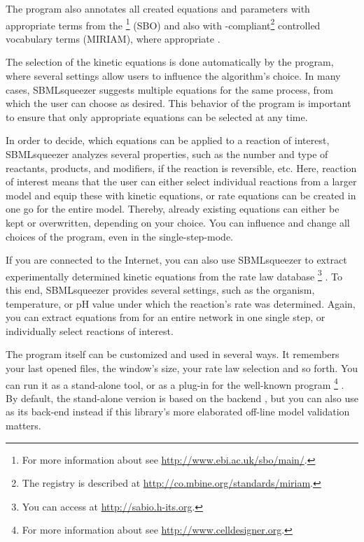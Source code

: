 The program also annotates all created equations and parameters with appropriate
terms from the \SBO\footnote{For more information about \SBO see \url{http://www.ebi.ac.uk/sbo/main/}.}
(\acl{SBO}) and also
with \MIRIAM-compliant\footnote{The \MIRIAM registry is described at \url{http://co.mbine.org/standards/miriam}.}
controlled vocabulary terms (\acl{MIRIAM}), where appropriate \citep{Le2005, Novere2006b, Laible2007, Courtot2011}.

The selection of the kinetic equations is done automatically by the program,
where several settings allow users to influence the algorithm's choice.
In many cases, SBMLsqueezer suggests multiple equations for the same process,
from which the user can choose as desired.
This behavior of the program is important to ensure that only appropriate
equations can be selected at any time.

In order to decide, which equations can be applied to a reaction of interest,
SBMLsqueezer analyzes several properties, such as the number and type of
reactants, products, and modifiers, if the reaction is reversible, etc.
Here, reaction of interest means that the user can either select individual
reactions from a larger model and equip these with kinetic equations, or rate
equations can be created in one go for the entire model.
Thereby, already existing equations can either be kept or overwritten, depending
on your choice.
You can influence and change all choices of the program, even in the single-step-mode.

If you are connected to the Internet, you can also use SBMLsqueezer to extract
experimentally determined kinetic equations from the rate law database
\SABIO\footnote{You can access \SABIO at \url{http://sabio.h-its.org}.}
\citep{Wittig2006, Rojas2007, Krebs2007, Wittig2012}.
To this end, SBMLsqueezer provides several settings, such as the organism,
temperature, or pH value under which the reaction's rate was determined. Again,
you can extract equations from \SABIO for an entire network in one single step, or
individually select reactions of interest.

The program itself can be customized and used in several ways. It remembers your
last opened files, the window's size, your rate law selection and so forth.
You can run it as a stand-alone tool, or as a plug-in for the well-known program
\CellDesigner\footnote{For more information about \CellDesigner see \url{http://www.celldesigner.org}.}
\citep{Funahashi2003, Funahashi2006, Funahashi2007a, Funahashi2008}.
By default, the stand-alone version is based on the \JSBML backend 
\citep{Draeger2011b}, but you can also use \libSBML \citep{Bornstein2008} as its
\SBML back-end instead if this library's more elaborated off-line model validation
matters.

